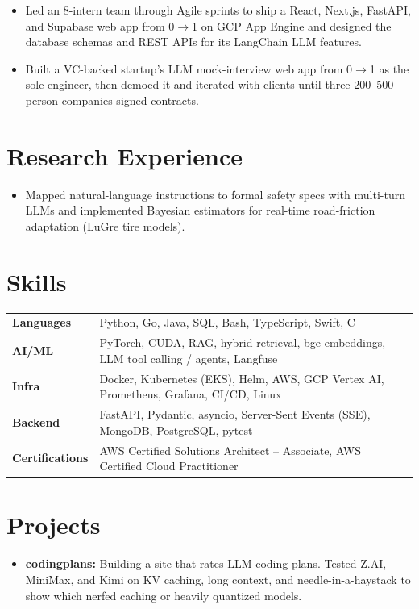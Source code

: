 \documentclass[11pt, letterpaper]{article}
\begin{document}
\vspace{1pt}
\begin{itemize}
  \item Led an 8-intern team through Agile sprints to ship a React, Next.js, FastAPI, and Supabase web app from 0$\to$1 on GCP App Engine and designed the database schemas and REST APIs for its LangChain LLM features.
\end{itemize}

\vspace{1pt}
\begin{itemize}
  \item Built a VC-backed startup's LLM mock-interview web app from 0$\to$1 as the sole engineer, then demoed it and iterated with clients until three 200--500-person companies signed contracts.
\end{itemize}

\section{Research Experience}
\begin{itemize}
  \item Mapped natural-language instructions to formal safety specs with multi-turn LLMs and implemented Bayesian estimators for real-time road-friction adaptation (LuGre tire models).
\end{itemize}

\section{Skills}
\begin{tabularx}{\textwidth}{@{}l @{\hspace{7pt}} >{\raggedright\arraybackslash}X@{}}
  \textbf{Languages} & Python, Go, Java, SQL, Bash, TypeScript, Swift, C \\[1pt]
  \textbf{AI/ML} & PyTorch, CUDA, RAG, hybrid retrieval, bge embeddings, LLM tool calling / agents, Langfuse \\[1pt]
  \textbf{Infra} & Docker, Kubernetes (EKS), Helm, AWS, GCP Vertex AI, Prometheus, Grafana, CI/CD, Linux \\[1pt]
  \textbf{Backend} & FastAPI, Pydantic, asyncio, Server-Sent Events (SSE), MongoDB, PostgreSQL, pytest \\[1pt]
  \textbf{Certifications} & AWS Certified Solutions Architect -- Associate, AWS Certified Cloud Practitioner \\
\end{tabularx}

\section{Projects}
\begin{itemize}
  \item \textbf{codingplans:} Building a site that rates LLM coding plans. Tested Z.AI, MiniMax, and Kimi on KV caching, long context, and needle-in-a-haystack to show which nerfed caching or heavily quantized models.
\end{itemize}
\end{document}
